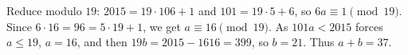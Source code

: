 Reduce modulo $19$: $2015=19\cdot106+1$ and $101=19\cdot5+6$, so $6a\equiv1\pmod{19}$. Since $6\cdot16=96=5\cdot19+1$, we get $a\equiv16\pmod{19}$. As $101a<2015$ forces $a\le19$, $a=16$, and then $19b=2015-1616=399$, so $b=21$. Thus $a+b=\boxed{37}$.
